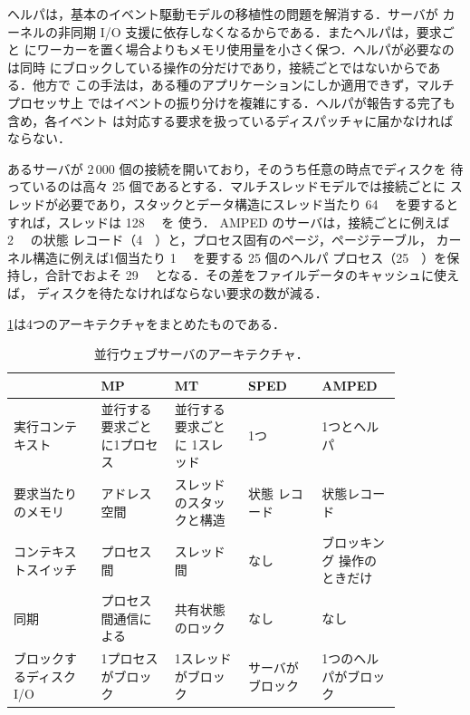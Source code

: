 \documentclass[../main.tex]{subfiles}
\begin{document}
ヘルパは，基本のイベント駆動モデルの移植性の問題を解消する．サーバが
カーネルの非同期 I/O 支援に依存しなくなるからである．またヘルパは，要求ごと
にワーカーを置く場合よりもメモリ使用量を小さく保つ．ヘルパが必要なのは同時
にブロックしている操作の分だけであり，接続ごとではないからである．他方で
この手法は，ある種のアプリケーションにしか適用できず，マルチプロセッサ上
ではイベントの振り分けを複雑にする．ヘルパが報告する完了も含め，各イベント
は対応する要求を扱っているディスパッチャに届かなければならない．

\begin{example}
  あるサーバが 2\,000 個の接続を開いており，そのうち任意の時点でディスクを
  待っているのは高々 25 個であるとする．マルチスレッドモデルでは接続ごとに
  スレッドが必要であり，スタックとデータ構造にスレッド当たり
  \SI{64}{\kilo\byte} を要するとすれば，スレッドは \SI{128}{\mega\byte} を
  使う．%
  AMPED のサーバは，接続ごとに例えば \SI{2}{\kilo\byte} の状態
  レコード（\SI{4}{\mega\byte}）と，プロセス固有のページ，ページテーブル，
  カーネル構造に例えば1個当たり \SI{1}{\mega\byte} を要する 25 個のヘルパ
  プロセス（\SI{25}{\mega\byte}）を保持し，合計でおよそ
  \SI{29}{\mega\byte} となる．その差をファイルデータのキャッシュに使えば，
  ディスクを待たなければならない要求の数が減る．
\end{example}

\cref{tab:l06-models}は4つのアーキテクチャをまとめたものである．

\begin{table}[htbp]
  \centering
  \caption{並行ウェブサーバのアーキテクチャ．}
  \label{tab:l06-models}
  \small
  \begin{tabular}{@{}>{\raggedright\arraybackslash}p{0.19\linewidth}>{\raggedright\arraybackslash}p{0.165\linewidth}>{\raggedright\arraybackslash}p{0.165\linewidth}>{\raggedright\arraybackslash}p{0.165\linewidth}>{\raggedright\arraybackslash}p{0.165\linewidth}@{}}
    \toprule
    & MP & MT & SPED & AMPED \\
    \midrule
    実行コンテキスト & 並行する要求ごとに1プロセス & 並行する要求ごとに
      1スレッド & 1つ & 1つとヘルパ \\
    要求当たりのメモリ & アドレス空間 & スレッドのスタックと構造 & 状態
      レコード & 状態レコード \\
    コンテキストスイッチ & プロセス間 & スレッド間 & なし & ブロッキング
      操作のときだけ \\
    同期 & プロセス間通信による & 共有状態のロック & なし & なし \\
    ブロックするディスク I/O & 1プロセスがブロック & 1スレッドがブロック &
      サーバがブロック & 1つのヘルパがブロック \\
    \bottomrule
  \end{tabular}
\end{table}
\end{document}
